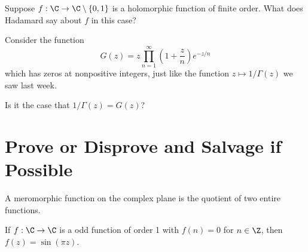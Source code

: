 \documentclass{homework}
\begin{document}
\begin{problem}
  Suppose $f : \C \to \C \setminus \{0, 1\}$ is a holomorphic function
  of finite order.  What does Hadamard say about $f$ in this case?
\end{problem}

\begin{problem}
  Consider the function
  \[
    G(z) = z \prod_{n=1}^\infty \left( 1 + \frac{z}{n} \right) e^{-z/n}
  \]
  which has zeros at nonpositive integers, just like the function
  $z \mapsto 1/\Gamma(z)$ we saw last week.

  Is it the case that $1/\Gamma(z) = G(z)$?
\end{problem}

\section{Prove or Disprove and Salvage if Possible}

\begin{problem}
  A meromorphic function on the complex plane is the quotient of two
  entire functions.
\end{problem}

\begin{problem}
  If $f : \C \to \C$ is a odd function of order 1 with $f(n) = 0$ for
  $n \in \Z$, then $f(z) = \sin (\pi z)$.
\end{problem}
\end{document}
